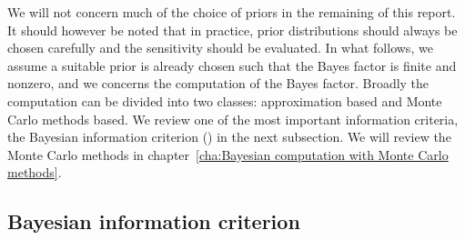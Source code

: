 We will not concern much of the choice of priors in the remaining of this
report. It should however be noted that in practice, prior distributions
should always be chosen carefully and the sensitivity should be evaluated. In
what follows, we assume a suitable prior is already chosen such that the Bayes
factor is finite and nonzero, and we concerns the computation of the Bayes
factor. Broadly the computation can be divided into two classes: approximation
based and Monte Carlo methods based. We review one of the most important
information criteria, the Bayesian information criterion (\bic) in the next
subsection. We will review the Monte Carlo methods in
chapter~\ref{cha:Bayesian computation with Monte Carlo methods}.

\subsection{Bayesian information criterion}
\label{sub:Bayesian information criterion}

